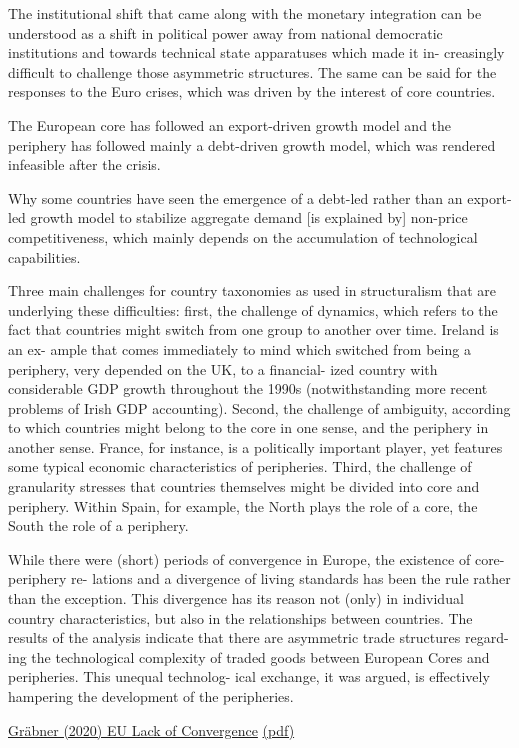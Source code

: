 \documentclass[
]{book}
\begin{document}
The institutional shift that came along with
the monetary integration can be understood as a shift in
political power away from national democratic institutions
and towards technical state apparatuses which made it in-
creasingly difficult to challenge those asymmetric structures.
The same can be said for
the responses to the Euro crises, which was driven by the
interest of core countries.

The European core has followed
an export-driven growth model and the periphery has
followed mainly a debt-driven growth model, which was
rendered infeasible after the crisis.

Why some countries have seen the emergence of a debt-led rather
than an export-led growth model to stabilize aggregate
demand {[}is explained by{]} non-price competitiveness,
which mainly depends on the accumulation of technological capabilities.

Three
main challenges for country taxonomies as used in structuralism
that are underlying these difficulties: first, the challenge
of dynamics, which refers to the fact that countries might
switch from one group to another over time. Ireland is an ex-
ample that comes immediately to mind which switched from
being a periphery, very depended on the UK, to a financial-
ized country with considerable GDP growth throughout the
1990s (notwithstanding more recent problems of Irish GDP
accounting). Second, the challenge of ambiguity, according
to which countries might belong to the core in one sense,
and the periphery in another sense. France, for instance,
is a politically important player, yet features some typical
economic characteristics of peripheries. Third, the challenge
of granularity stresses that countries themselves might be
divided into core and periphery. Within Spain, for example,
the North plays the role of a core, the South the role of a
periphery.

While there were (short) periods
of convergence in Europe, the existence of core-periphery re-
lations and a divergence of living standards has been the rule
rather than the exception. This divergence has its reason not
(only) in individual country characteristics, but also in the
relationships between countries. The results of the analysis
indicate that there are asymmetric trade structures regard-
ing the technological complexity of traded goods between
European Cores and peripheries. This unequal technolog-
ical exchange, it was argued, is effectively hampering the
development of the peripheries.

\href{https://www.rebuildingmacroeconomics.ac.uk/post/what-are-the-reasons-for-the-lack-of-overall-convergence-in-the-eu-a-structuralist-view}{Gräbner (2020) EU Lack of Convergence}
\href{pdf/Graeber_2020_Core_periphery_EU.pdf}{(pdf)}
\end{document}
